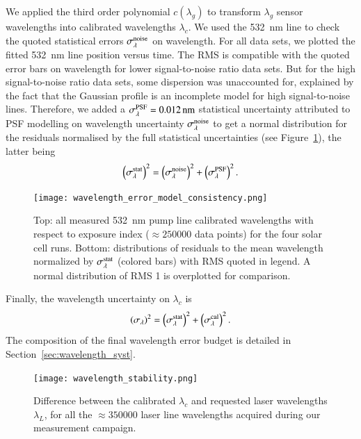 We applied the third order polynomial $c(\lambda_g)$ to transform $\lambda_g$ sensor wavelengths into calibrated wavelengths $\lambda_c$. We used the \SI{532}{\nm} line to check the quoted statistical errors $\sigma_\lambda^{\rm noise}$ on wavelength. For all data sets, we plotted the fitted \SI{532}{\nm} line position versus time. The RMS is compatible with the quoted error bars on wavelength for lower signal-to-noise ratio data sets. But for the high signal-to-noise ratio data sets, some dispersion was unaccounted for, explained by the fact that the Gaussian profile is an incomplete model for high signal-to-noise lines. Therefore, we added a $\sigma_\lambda^{\rm PSF}=\SI{0.012}{\nm}$ statistical uncertainty attributed to PSF modelling on wavelength uncertainty $\sigma_{\lambda}^{\rm noise}$ to get a normal distribution for the residuals normalised by the full statistical uncertainties (see Figure~\ref{fig:wavelength_error_model_consistency}), the latter being
\begin{equation}
    \left(\sigma_{\lambda}^{\rm stat}\right)^2 =  \left(\sigma_{\lambda}^{\rm noise}\right)^2 +  \left(\sigma_{\lambda}^{\rm PSF}\right)^2.
\end{equation}

\begin{figure}[!h]
\centering
\texttt{[image: wavelength\_error\_model\_consistency.png]}
\caption{Top: all measured \SI{532}{\nm} pump line calibrated wavelengths with respect to exposure index ($\approx\num{250000}$ data points) for the four solar cell runs. Bottom: distributions of residuals to the mean wavelength normalized by $\sigma_{\lambda}^{\rm stat}$ (colored bars) with RMS quoted in legend. A normal distribution of RMS 1 is overplotted for comparison.}\label{fig:wavelength_error_model_consistency}
\end{figure}

Finally, the wavelength uncertainty on $\lambda_c$ is
\begin{equation}
  \left(\sigma_{\lambda}\right)^2 =  \left(\sigma_{\lambda}^{\rm stat}\right)^2 +  \left(\sigma_{\lambda}^{\rm cal}\right)^2.   
\end{equation}
The composition of the final wavelength error budget is detailed in Section~\ref{sec:wavelength_syst}.


\begin{figure}[!h]
\centering
\texttt{[image: wavelength\_stability.png]}
\caption{Difference between the calibrated $\lambda_c$ and requested laser wavelengths $\lambda_L$, for all the $\approx \num{350000}$ laser line wavelengths acquired during our measurement campaign.}\label{fig:wavelength_stability}
\end{figure}


